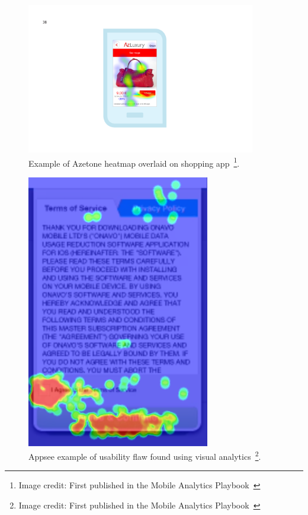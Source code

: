 \begin{figure}[ht]
    \begin{minipage}{\textwidth}
    \centering
    \includegraphics[width=10cm]{images/mobile-analytics-playbook/Chart-10-azetone.png}
    \caption[Example of Azetone heatmap overlaid on shopping app]{Example of Azetone heatmap overlaid on shopping app~\footnote{Image credit: First published in the Mobile Analytics Playbook~\cite{harty_aymer_playbook_2016}}.}
    \label{fig:azetone-heatmap-example}
    \end{minipage}
\end{figure}

\begin{figure}[ht]
    \begin{minipage}{\textwidth}
    \centering
    \includegraphics[width=8cm]{images/mobile-analytics-playbook/Appsee-Screen-Heatmap.png}
    \caption[Appsee example of usability flaw found using visual analytics]{Appsee example of usability flaw found using visual analytics~\footnote{Image credit: First published in the Mobile Analytics Playbook~\cite{harty_aymer_playbook_2016}}.}
    \label{fig:appsee-example-t-and-c-screen}
    \end{minipage}
\end{figure}

